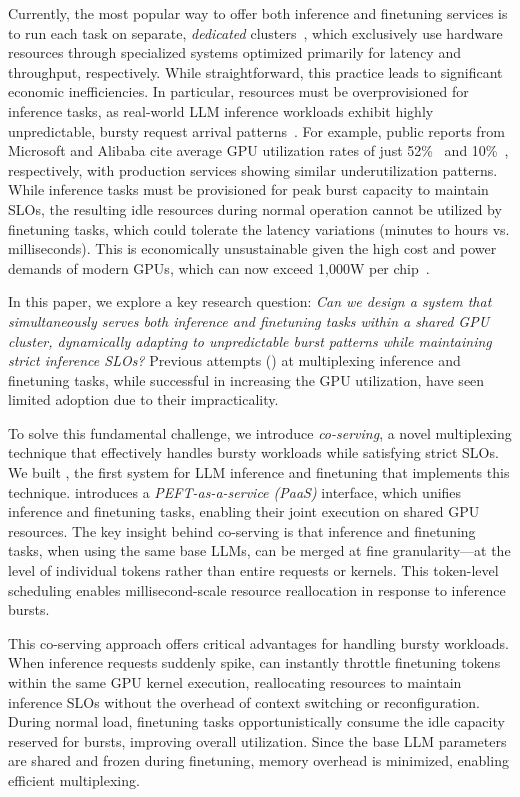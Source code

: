 Currently, the most popular way to offer both inference and finetuning services is to run each task on separate, {\em dedicated} clusters~\cite{weng2022mlaas,gao2022deep,chen2023deepboot}, which exclusively use hardware resources through specialized systems optimized primarily for latency and throughput, respectively. While straightforward, this practice leads to significant economic inefficiencies. In particular, resources must be overprovisioned for inference tasks, as real-world LLM inference workloads exhibit highly unpredictable, bursty request arrival patterns~\cite{wang2024towards}. For example, public reports from Microsoft and Alibaba cite average GPU utilization rates of just 52\%~\cite{lithos2025} and 10\%~\cite{lithos2025}, respectively, with production services showing similar underutilization patterns. While inference tasks must be provisioned for peak burst capacity to maintain SLOs, the resulting idle resources during normal operation cannot be utilized by finetuning tasks, which could tolerate the latency variations (minutes to hours vs. milliseconds). This is economically unsustainable given the high cost and power demands of modern GPUs, which can now exceed 1,000W per chip~\cite{lithos2025}.

In this paper, we explore a key research question: {\em Can we design a system that {\em simultaneously} serves both inference and finetuning tasks within a shared GPU cluster, dynamically adapting to unpredictable burst patterns while maintaining strict inference SLOs?}
Previous attempts () at multiplexing inference and finetuning tasks, while successful in increasing the GPU utilization, have seen limited adoption due to their impracticality.

To solve this fundamental challenge, we introduce \textit{co-serving}, a novel multiplexing technique that effectively handles bursty workloads while satisfying strict SLOs. We built \sys, the first system for LLM inference and finetuning that implements this technique. \sys introduces a \textit{PEFT-as-a-service (PaaS)} interface, which unifies inference and finetuning tasks, enabling their joint execution on shared GPU resources.
The key insight behind co-serving is that inference and finetuning tasks, when using the same base LLMs, can be merged at fine granularity—at the level of individual tokens rather than entire requests or kernels. This token-level scheduling enables millisecond-scale resource reallocation in response to inference bursts.

This co-serving approach offers critical advantages for handling bursty workloads. When inference requests suddenly spike, \sys can instantly throttle finetuning tokens within the same GPU kernel execution, reallocating resources to maintain inference SLOs without the overhead of context switching or reconfiguration. During normal load, finetuning tasks opportunistically consume the idle capacity reserved for bursts, improving overall utilization. Since the base LLM parameters are shared and frozen during finetuning, memory overhead is minimized, enabling efficient multiplexing.

